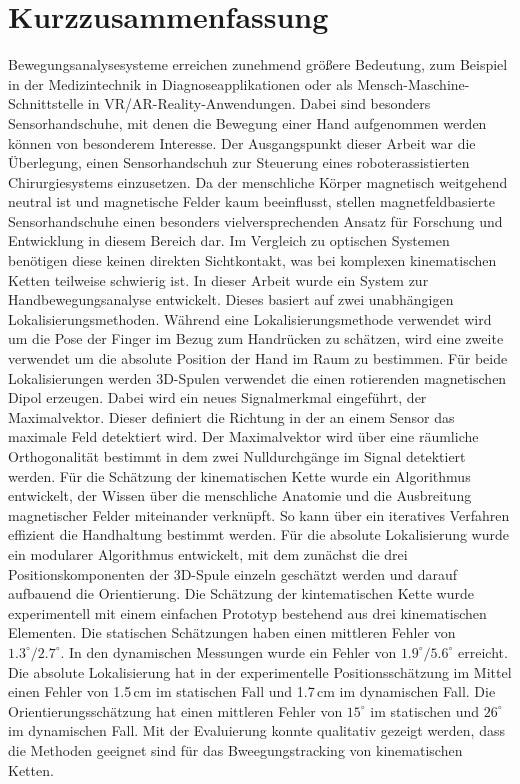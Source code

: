 \chapter*{Kurzzusammenfassung}

   Bewegungsanalysesysteme erreichen zunehmend größere Bedeutung, zum Beispiel in der Medizintechnik in Diagnoseapplikationen oder als Mensch-Maschine-Schnittstelle in VR/AR-Reality-Anwendungen. Dabei sind besonders Sensorhandschuhe, mit denen die Bewegung einer Hand aufgenommen werden können von besonderem Interesse. Der Ausgangspunkt dieser Arbeit war die Überlegung, einen Sensorhandschuh zur Steuerung eines roboterassistierten Chirurgiesystems einzusetzen. Da der menschliche Körper magnetisch weitgehend neutral ist und magnetische Felder kaum beeinflusst, stellen magnetfeldbasierte Sensorhandschuhe einen besonders vielversprechenden Ansatz für Forschung und Entwicklung in diesem Bereich dar. Im Vergleich zu optischen Systemen benötigen diese keinen direkten Sichtkontakt, was bei komplexen kinematischen Ketten teilweise schwierig ist. 
   In dieser Arbeit wurde ein System zur Handbewegungsanalyse entwickelt. Dieses basiert auf zwei unabhängigen Lokalisierungsmethoden. Während eine Lokalisierungsmethode verwendet wird um die Pose der Finger im Bezug zum Handrücken zu schätzen, wird eine zweite verwendet um die absolute Position der Hand im Raum zu bestimmen. Für beide Lokalisierungen werden 3D-Spulen verwendet die einen rotierenden magnetischen Dipol erzeugen. Dabei wird ein neues Signalmerkmal eingeführt, der Maximalvektor. Dieser definiert die Richtung in der an einem Sensor das maximale Feld detektiert wird. Der Maximalvektor wird über eine räumliche Orthogonalität bestimmt in dem zwei Nulldurchgänge im Signal detektiert werden. 
   Für die Schätzung der kinematischen Kette wurde ein Algorithmus entwickelt, der Wissen über die menschliche Anatomie und die Ausbreitung magnetischer Felder miteinander verknüpft. So kann über ein iteratives Verfahren effizient die Handhaltung bestimmt werden.
   Für die absolute Lokalisierung wurde ein modularer Algorithmus entwickelt, mit dem zunächst die drei Positionskomponenten der 3D-Spule einzeln geschätzt werden und darauf aufbauend die Orientierung. 
   Die Schätzung der kintematischen Kette wurde experimentell mit einem einfachen Prototyp bestehend aus drei kinematischen Elementen. Die statischen Schätzungen haben einen mittleren Fehler von $1.3^\circ/2.7^\circ$. In den dynamischen Messungen wurde ein Fehler von $1.9^\circ/5.6^\circ$ erreicht.
   Die absolute Lokalisierung hat in der experimentelle Positionsschätzung im Mittel einen Fehler von 1.5\,cm im statischen Fall und 1.7\,cm im dynamischen Fall. Die Orientierungsschätzung hat einen mittleren Fehler von $15^\circ$ im statischen und $26^\circ$ im dynamischen Fall. 
   Mit der Evaluierung konnte qualitativ gezeigt werden, dass die Methoden geeignet sind für das Bweegungstracking von kinematischen Ketten.
   
